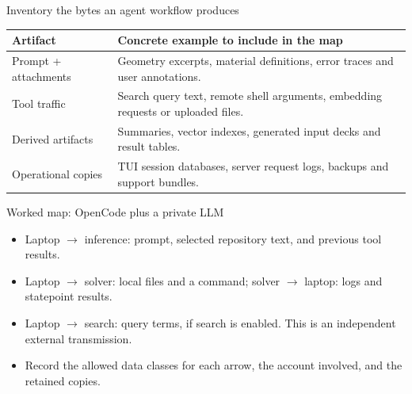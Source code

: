 \documentclass[aspectratio=169,11pt]{beamer}
\begin{document}
\begin{frame}[t,fragile]{Inventory the bytes an agent workflow produces}
\fontsize{10.5}{12.5}\selectfont\setlength{\tabcolsep}{4pt}\renewcommand{\arraystretch}{1.15}
\begin{tabular}{>{\raggedright\arraybackslash}p{}>{\raggedright\arraybackslash}p{}}
\toprule
\textbf{Artifact} & \textbf{Concrete example to include in the map} \\ \midrule
Prompt + attachments & Geometry excerpts, material definitions, error traces and user annotations. \\[2pt]
Tool traffic & Search query text, remote shell arguments, embedding requests or uploaded files. \\[2pt]
Derived artifacts & Summaries, vector indexes, generated input decks and result tables. \\[2pt]
Operational copies & TUI session databases, server request logs, backups and support bundles. \\[2pt]
\bottomrule\end{tabular}\par\vspace{2mm}
\end{frame}
\begin{frame}[t,fragile]{Worked map: OpenCode plus a private LLM}
\fontsize{11.5}{14}\selectfont
\begin{itemize}\setlength{\itemsep}{2mm}
\item Laptop $\rightarrow$ inference: prompt, selected repository text, and previous tool results.
\item Laptop $\rightarrow$ solver: local files and a command; solver $\rightarrow$ laptop: logs and statepoint results.
\item Laptop $\rightarrow$ search: query terms, if search is enabled. This is an independent external transmission.
\item Record the allowed data classes for each arrow, the account involved, and the retained copies.
\end{itemize}
\end{frame}
\end{document}
